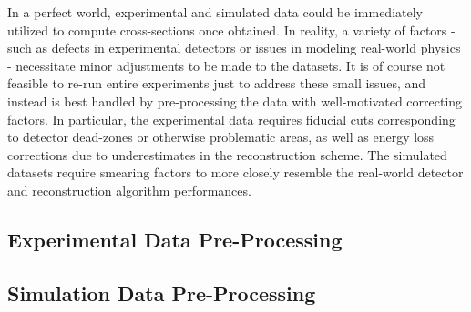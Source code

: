 
In a perfect world, experimental and simulated data could be immediately utilized to compute cross-sections once obtained. In reality, a variety of factors - such as defects in experimental detectors or issues in modeling real-world physics - necessitate minor adjustments to be made to the datasets. It is of course not feasible to re-run entire experiments just to address these small issues, and instead is best handled by pre-processing the data with well-motivated correcting factors.  In particular, the experimental data requires fiducial cuts corresponding to detector dead-zones or otherwise problematic areas, as well as energy loss corrections due to underestimates in the reconstruction scheme. The simulated datasets require smearing factors to more closely resemble the real-world detector and reconstruction algorithm performances. 

\subsection{Experimental Data Pre-Processing}
     
     
\subsection{Simulation Data Pre-Processing}
   




